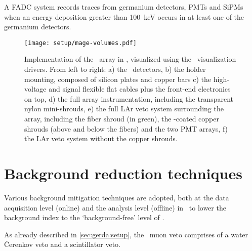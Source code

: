 A FADC system records traces from germanium detectors, PMTs and SiPMs when an energy
deposition greater than 100~keV occurs in at least one of the germanium detectors.

\begin{figure}
  \centering
  \texttt{[image: setup/mage-volumes.pdf]}
  \caption{%
    Implementation of the \gerda\ array in \mage, visualized using the
    \geant\ visualization drivers. From left to right: a) the \gerda\
    detectors, b) the holder mounting, composed of silicon plates and
    copper bars c) the high-voltage and signal flexible flat cables plus
    the front-end electronics on top, d) the full array instrumentation,
    including the transparent nylon mini-shrouds, e) the full LAr veto
    system surrounding the array, including the fiber shroud (in green),
    the \tetratex-coated copper shrouds (above and below the fibers) and
    the two PMT arrays, f) the LAr veto system without the copper
    shrouds.%
  }\label{fig:setup:magevolumes}
\end{figure}

\section{Background reduction techniques}\label{sec:gerda:cuts}

Various background mitigation techniques are adopted, both at the data acquisition level
(online) and the analysis level (offline) in \gerda\ to lower the background index to the
`background-free' level of \pIIbi.

As already described in \cref{sec:gerda:setup}, the \gerda\ muon veto comprises of a water
\v{C}erenkov veto and a scintillator veto.


